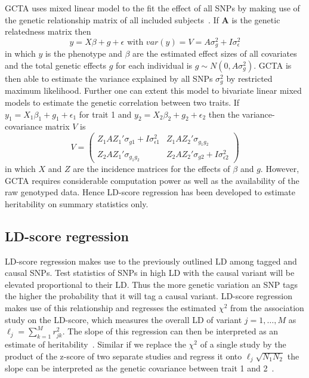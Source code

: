 \documentclass[../header.tex]{subfiles}
\begin{document}
GCTA uses mixed linear model to the fit the effect of all SNPs by making use of the genetic relationship matrix of all included subjects~\cite{Yang2011}.
If $\textbf{A}$ is the genetic relatedness matrix then
\begin{equation}
  y = X\beta + g + \epsilon \text{ with } var(y) = V = A\sigma^2_g + I\sigma^2_\epsilon
\end{equation}
in which $y$ is the phenotype and $\beta$ are the estimated effect sizes of all covariates and the total genetic effects $g$ for each individual is $g \sim N(0, A\sigma^2_g)$.
GCTA is then able to estimate the variance explained by all SNPs $\sigma^2_g$ by restricted maximum likelihood.
Further one can extent this model to bivariate linear mixed models to estimate the genetic correlation between two traits.
If $y_1 = X_1\beta_1 + g_1 + \epsilon_1$ for trait 1 and $y_2= X_2\beta_2 + g_2 + \epsilon_2$ then the variance-covariance matrix $V$ is
\begin{equation}
  V = 
  \begin{pmatrix}
    Z_1AZ_1'\sigma_{g1} + I\sigma^2_{\epsilon 1} & Z_1AZ_2'\sigma_{g_1g_2} \\
    Z_2AZ_1'\sigma_{g_1g_2} & Z_2AZ_2'\sigma_{g2} + I\sigma^2_{\epsilon 2}
  \end{pmatrix}
\end{equation}
in which $X$ and $Z$ are the incidence matrices for the effects of $\beta$ and $g$.
However, GCTA requires considerable computation power as well as the availability of the raw genotyped data.
Hence LD-score regression has been developed to estimate heritability on summary statistics only.

\subsection{LD-score regression}
\label{sub:ld_score_regression}

LD-score regression makes use to the previously outlined LD among tagged and causal SNPs.
Test statistics of SNPs in high LD with the causal variant will be elevated proportional to their LD\@.
Thus the more genetic variation an SNP tags the higher the probability that it will tag a causal variant.
LD-score regression makes use of this relationship and regresses the estimated $\chi^2$ from the association study on the LD-score, which measures the overall LD of variant $j = 1, \ldots, M$ as $\ell_j = \sum^M_{k=1} r^2_{jk}$. 
The slope of this regression can then be interpreted as an estimate of heritability~\cite{Bulik-Sullivan2015}.
Similar if we replace the $\chi^2$ of a single study by the product of the z-score of two separate studies and regress it onto $\ell_j \sqrt{N_{1}N_{2}}$ the slope can be interpreted as the genetic covariance between trait 1 and 2~\cite{Bulik-Sullivan2015a}.
\end{document}
